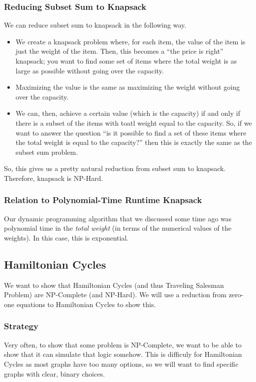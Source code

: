 \documentclass[letterpaper]{article}
\begin{document}
\subsubsection{Reducing Subset Sum to Knapsack}
We can reduce subset sum to knapsack in the following way. 
\begin{itemize}
    \item We create a knapsack problem where, for each item, the value of the item is just the weight of the item. Then, this becomes a ``the price is right'' knapsack; you want to find some set of items where the total weight is as large as possible without going over the capacity. 
    \item Maximizing the value is the same as maximizing the weight without going over the capacity. 
    \item We can, then, achieve a certain value (which is the capacity) if and only if there is a subset of the items with toatl weight equal to the capacity. So, if we want to answer the question ``is it possible to find a set of these items where the total weight is equal to the capacity?'' then this is exactly the same as the subset sum problem. 
\end{itemize}
So, this gives us a pretty natural reduction from subset sum to knapsack. Therefore, knapsack is NP-Hard. 

\subsubsection{Relation to Polynomial-Time Runtime Knapsack}
Our dynamic programming algorithm that we discussed some time ago was polynomial time in the \emph{total weight} (in terms of the numerical values of the weights). In this case, this is exponential. 


\subsection{Hamiltonian Cycles}
We want to show that Hamiltonian Cycles (and thus Traveling Salesman Problem) are NP-Complete (and NP-Hard). We will use a reduction from zero-one equations to Hamiltonian Cycles to show this. 

\subsubsection{Strategy}
Very often, to show that some problem is NP-Complete, we want to be able to show that it can simulate that logic somehow. This is difficuly for Hamiltonian Cycles as most graphs have too many options, so we will want to find specific graphs with clear, binary choices. 
\end{document}
